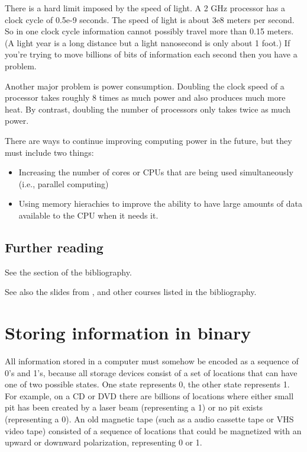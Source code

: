 \documentclass[letterpaper,10pt,english]{sphinxmanual}
\begin{document}
There is a hard limit imposed by the speed of light.  A 2 GHz
processor has a clock cycle of 0.5e-9 seconds.  The speed of light is
about 3e8 meters per second. So in one clock cycle information cannot
possibly travel more than 0.15 meters.  (A light year is a long distance but
a light nanosecond is only about 1 foot.)  If you're trying to move billions
of bits of information each second then you have a problem.

Another major problem is power consumption.  Doubling the clock speed of a
processor takes roughly 8 times as much power and also produces much more
heat.  By contrast, doubling the number of processors only takes twice as
much power.

There are ways to continue improving computing power in the future, but they
must include two things:
\begin{itemize}
\item {} 
Increasing the number of cores or CPUs that are being used simultaneously
(i.e., parallel computing)

\item {} 
Using memory hierachies to improve the ability to have large amounts of
data available to the CPU when it needs it.

\end{itemize}


\subsection{Further reading}
\label{computer_arch:further-reading}
See the {\hyperref[biblio:biblio\string-computer\string-arch]{}} section of the bibliography.

See also the slides from \label{computer_arch:id1}{\hyperref[biblio:yelick\string-ucb]{}}, \label{computer_arch:id2}{\hyperref[biblio:gropp\string-uiuc]{}} and other courses
listed in the bibliography.


\section{Storing information in binary}
\label{memory:storing-information-in-binary}\label{memory::doc}\label{memory:memory}
All information stored in a computer must somehow be encoded as a sequence
of 0's and 1's, because all
storage devices consist of a set of locations that can have one of two possible
states.  One state represents 0, the other state represents 1.  For example,
on a CD or DVD there are billions of locations where either small pit has
been created by a laser beam (representing a 1) or no pit exists
(representing a 0).  An old magnetic tape (such as a audio cassette tape or
VHS video tape) consisted of a sequence of locations that could be
magnetized with an upward or downward polarization, representing 0 or 1.
\end{document}
